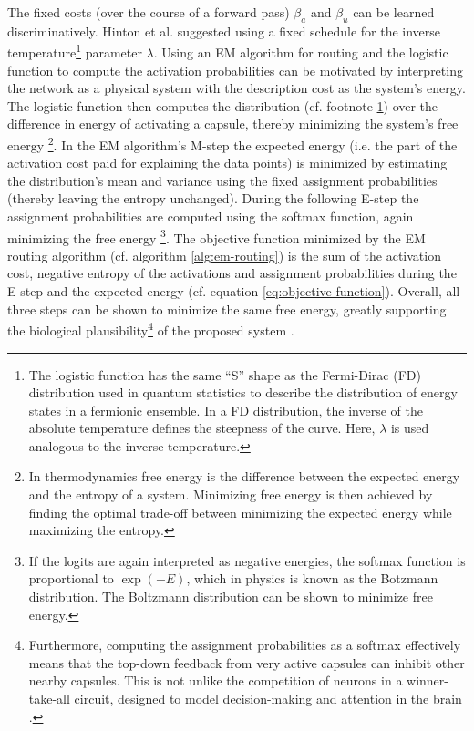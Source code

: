 The fixed costs (over the course of a forward pass) $\beta_a$ and $\beta_u$ can be learned discriminatively. Hinton et al. suggested using a fixed schedule for the inverse temperature\footnote{The logistic function\label{foot:fermi-dirac} has the same \enquote{S} shape as the Fermi-Dirac (FD) distribution used in quantum statistics to describe the distribution of energy states in a fermionic ensemble. In a FD distribution, the inverse of the absolute temperature defines the steepness of the curve. Here, $\lambda$ is used analogous to the inverse temperature.} parameter $\lambda$. Using an EM algorithm for routing and the logistic function to compute the activation probabilities can be motivated by interpreting the network as a physical system with the description cost as the system's energy. The logistic function then computes the distribution (cf. footnote \ref{foot:fermi-dirac}) over the difference in energy of activating a capsule, thereby minimizing the system's free energy \footnote{In thermodynamics free energy is the difference between the expected energy and the entropy of a system. Minimizing free energy is then achieved by finding the optimal trade-off between minimizing the expected energy while maximizing the entropy.}. In the EM algorithm's M-step the expected energy (i.e. the part of the activation cost paid for explaining the data points) is minimized by estimating the distribution's mean and variance using the fixed assignment probabilities (thereby leaving the entropy unchanged). During the following E-step the assignment probabilities are computed using the softmax function, again minimizing the free energy \footnote{If the logits are again interpreted as negative energies, the softmax function is proportional to $\exp(-E)$, which in physics is known as the Botzmann distribution. The Boltzmann distribution can be shown to minimize free energy.}. The objective function minimized by the EM routing algorithm (cf. algorithm \ref{alg:em-routing}) is the sum of the activation cost, negative entropy of the activations and assignment probabilities during the E-step and the expected energy (cf. equation \ref{eq:objective-function}). Overall, all three steps can be shown to minimize the same free energy, greatly supporting the biological plausibility\footnote{Furthermore, computing the assignment probabilities as a softmax effectively means that the top-down feedback from very active capsules can inhibit other nearby capsules. This is not unlike the competition of neurons in a winner-take-all circuit, designed to model decision-making and attention  in the brain \cite{lee1999attention}.} of the proposed system \cite{lecun2006tutorial}. 
